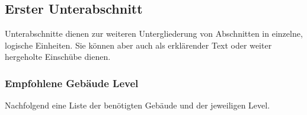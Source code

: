 \documentclass[fontsize=12pt,a4paper,draft]{scrartcl}[2003/01/01]
\begin{document}
\subsection[Die Subsection als Unterabschnitt]{Erster Unterabschnitt}
Unterabschnitte dienen zur weiteren Untergliederung von Abschnitten in einzelne, logische Einheiten. Sie können aber auch als
erklärender Text oder weiter hergeholte Einschübe dienen.

\subsubsection{Empfohlene Gebäude Level}
Nachfolgend eine Liste der benötigten Gebäude und der jeweiligen Level.
\end{document}
